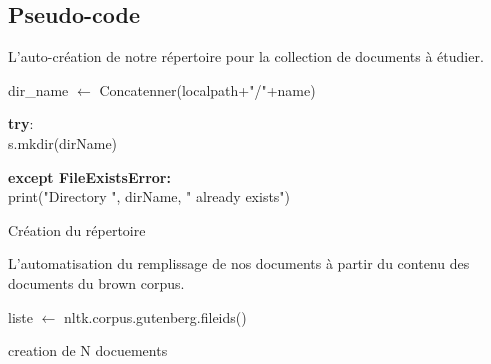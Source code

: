 \documentclass[12pt,a4paper,oneside]{article}
\begin{document}
\subsection{Pseudo-code}
L'auto-création de notre répertoire pour la collection de documents à étudier.



\begin{algorithm}[H]
	\DontPrintSemicolon

	dir\_name $\gets$ Concatenner(localpath+"/"+name)
	    
	    \textbf{try}:\\
	    \hspace*{0.5cm}
	    s.mkdir(dirName)
	    
	    \textbf{except FileExistsError:}\\
	    \hspace*{0.5cm}
	    print("Directory ", dirName, " already exists")

	\caption{{\sc Création du répertoire}}
	\label{algo:duplicate2}
\end{algorithm}

L'automatisation du remplissage de nos documents à partir du contenu des documents du brown corpus.


\begin{algorithm}[H]
	\DontPrintSemicolon
	
	liste $\gets$ nltk.corpus.gutenberg.fileids()
	
	
	\caption{{\sc creation de N docuements}}
	\label{algo:duplicate2}
\end{algorithm}
\end{document}

